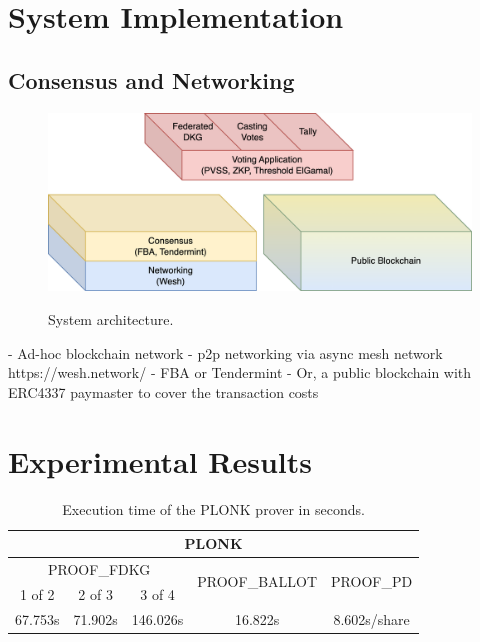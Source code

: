 \documentclass{article}
\begin{document}
\section{System Implementation}

\subsection{Consensus and Networking}

\begin{figure}
    \centering
    \includegraphics[width=\textwidth]{stack-bc.png}
    \label{fig:stack-bc}
    \caption{System architecture.}
\end{figure}

- Ad-hoc blockchain network
- p2p networking via async mesh network https://wesh.network/
- FBA or Tendermint
- Or, a public blockchain with ERC4337 paymaster to cover the transaction costs

\section{Experimental Results}

\begin{table}
\centering
\label{table:plonk-time}
\caption{Execution time of the PLONK prover in seconds.}
\begin{tabular}{|c|c|c|c|c|}
    \hline
    \multicolumn{5}{|c|}{PLONK} \\
    \hline
    \multicolumn{3}{|c|}{\textrm{PROOF}_\textrm{FDKG}} & \multirow{2}{*}{\textrm{PROOF}_\textrm{BALLOT}} & \multirow{2}{*}{\textrm{PROOF}_\textrm{PD}} \\
    \cline{1-3}
    1 of 2 & 2 of 3 & 3 of 4 & & \\
    \hline
    67.753s & 71.902s & 146.026s & 16.822s & 8.602s/share\\
    \hline
\end{tabular}
\end{table}
\end{document}
